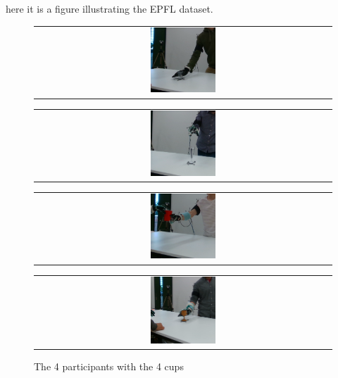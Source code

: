 here it is a figure illustrating the EPFL dataset.
    \begin{figure}
        \centering
        \begin{tabular}{@{}c@{}}
            \centering
            \includegraphics[width=0.225\textwidth,height=0.15\textheight]{Images/frame000023.png}
        \end{tabular}
        \begin{tabular}{@{}c@{}}
            \centering 
            \includegraphics[width=0.225\textwidth,height=0.15\textheight]{Images/frame000046.png}
        \end{tabular}
        \baselineskip
        \begin{tabular}{@{}c@{}}
            \centering 
            \includegraphics[width=0.225\textwidth,height=0.15\textheight]{Images/frame000117.png}
        \end{tabular}
        \begin{tabular}{@{}c@{}}
            \centering 
            \includegraphics[width=0.225\textwidth,height=0.15\textheight]{Images/frame000144.png}
        \end{tabular}
        \caption{The 4 participants with the 4 cups}
        \label{fig:epfl_dataset}
    \end{figure}

